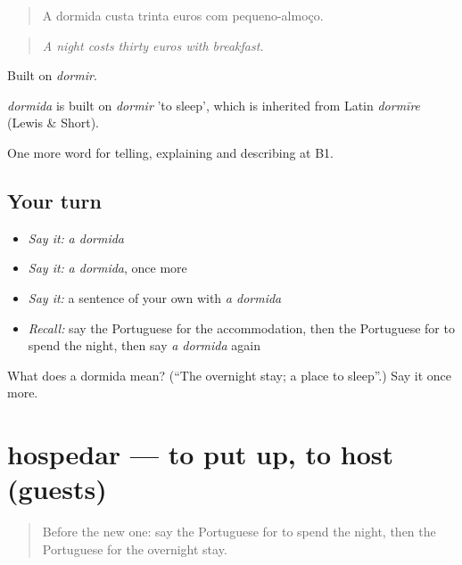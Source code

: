 \begin{quote}
A dormida custa trinta euros com pequeno-almoço.
\end{quote}

\begin{quote}
\emph{A night costs thirty euros with breakfast.}
\end{quote}

Built on \emph{dormir}.

\begin{cousinweb}
\emph{dormida} is built on \emph{dormir} 'to sleep', which is inherited from Latin \emph{dormīre} (Lewis \& Short).
\end{cousinweb}

\begin{grammarlens}[title={What you've built}]
One more word for telling, explaining and describing at B1.
\end{grammarlens}

\subsection*{Your turn}
\begin{itemize}
\raggedright
  \item \emph{Say it:} \emph{a dormida}
  \item \emph{Say it:} \emph{a dormida}, once more
  \item \emph{Say it:} a sentence of your own with \emph{a dormida}
  \item \emph{Recall:} say the Portuguese for the accommodation, then the Portuguese for to spend the night, then say \emph{a dormida} again
\end{itemize}

\begin{tcolorbox}[breakable,colback=teal!4,colframe=teal!35!black,title={Before you move on}]
What does a dormida mean? (\textquotedblleft{}The overnight stay; a place to sleep\textquotedblright{}.) Say it once more.
\end{tcolorbox}
\section[hospedar]{hospedar — to put up, to host (guests)}

\label{lesson:PT-C428-hospedar}



\begin{quote}
Before the new one: say the Portuguese for to spend the night, then the Portuguese for the overnight stay.
\end{quote}

